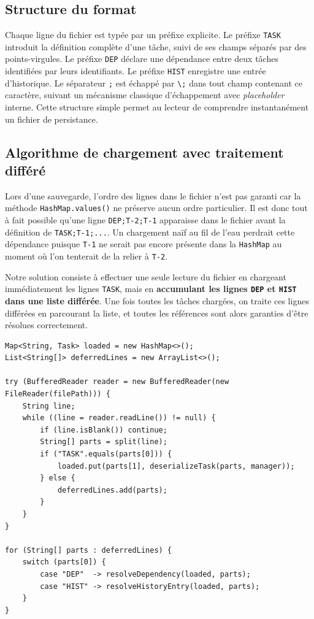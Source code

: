 \documentclass[11pt]{article}
\begin{document}
\subsection{Structure du format}
Chaque ligne du fichier est typée par un préfixe explicite. Le préfixe
\texttt{TASK} introduit la définition complète d'une tâche, suivi de ses
champs séparés par des points-virgules. Le préfixe \texttt{DEP} déclare
une dépendance entre deux tâches identifiées par leurs identifiants. Le
préfixe \texttt{HIST} enregistre une entrée d'historique. Le séparateur
\texttt{;} est échappé par \texttt{\textbackslash;} dans tout champ
contenant ce caractère, suivant un mécanisme classique d'échappement
avec \textit{placeholder} interne. Cette structure simple permet au
lecteur de comprendre instantanément un fichier de persistance.

\subsection{Algorithme de chargement avec traitement différé}
Lors d'une sauvegarde, l'ordre des lignes dans le fichier n'est pas
garanti car la méthode \texttt{HashMap.values()} ne préserve aucun ordre
particulier. Il est donc tout à fait possible qu'une ligne
\texttt{DEP;T-2;T-1} apparaisse dans le fichier avant la définition de
\texttt{TASK;T-1;...}. Un chargement naïf au fil de l'eau perdrait cette
dépendance puisque \texttt{T-1} ne serait pas encore présente dans la
\texttt{HashMap} au moment où l'on tenterait de la relier à \texttt{T-2}.

Notre solution consiste à effectuer une seule lecture du fichier en
chargeant immédiatement les lignes \texttt{TASK}, mais en
\textbf{accumulant les lignes \texttt{DEP} et \texttt{HIST} dans une
liste différée}. Une fois toutes les tâches chargées, on traite ces
lignes différées en parcourant la liste, et toutes les références sont
alors garanties d'être résolues correctement.

\begin{lstlisting}[caption={Chargement en une lecture avec traitement différé}]
Map<String, Task> loaded = new HashMap<>();
List<String[]> deferredLines = new ArrayList<>();

try (BufferedReader reader = new BufferedReader(new FileReader(filePath))) {
    String line;
    while ((line = reader.readLine()) != null) {
        if (line.isBlank()) continue;
        String[] parts = split(line);
        if ("TASK".equals(parts[0])) {
            loaded.put(parts[1], deserializeTask(parts, manager));
        } else {
            deferredLines.add(parts);
        }
    }
}

for (String[] parts : deferredLines) {
    switch (parts[0]) {
        case "DEP"  -> resolveDependency(loaded, parts);
        case "HIST" -> resolveHistoryEntry(loaded, parts);
    }
}
\end{lstlisting}
\end{document}
